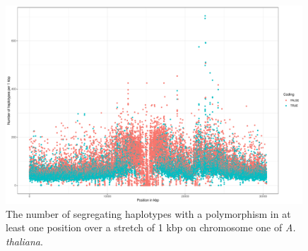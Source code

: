 \begin{figure}[H]
\centering 
\includegraphics[height=.55\textheight, width=0.99\textwidth]{Figures/chr1_hap}
\decoRule
\caption[Haplotype structure of chromosome 1 of \textit{A. thaliana}]{The number of
 segregating haplotypes with a polymorphism in at least one position over a stretch of 1
 kbp on chromosome one of \textit{A. thaliana}.}
\label{fig:chr1}
\end{figure}

